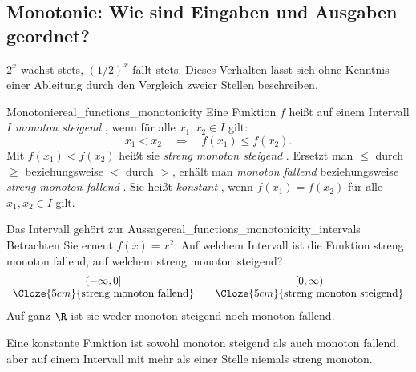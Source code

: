 \subsection{Monotonie: Wie sind Eingaben und Ausgaben geordnet?}
\label{subsec:real_functions_monotonicity}
$2^x$ wächst stets, $(1/2)^x$ fällt stets. Dieses Verhalten lässt
sich ohne Kenntnis einer Ableitung durch den Vergleich zweier Stellen
beschreiben.
\par\noindent\begin{minipage}{\linewidth}
\begin{FunctionPropertyBox}{Monotonie}{real_functions_monotonicity}
  Eine Funktion $f$ heißt auf einem Intervall $I$
  \emph{monoton steigend} ,
  wenn für alle $x_1,x_2\in I$ gilt:
  \[
    x_1<x_2\quad\Longrightarrow\quad f(x_1)\le f(x_2).
  \]
  Mit $f(x_1)<f(x_2)$ heißt sie \emph{streng monoton steigend}
  .
  Ersetzt man $\le$ durch $\ge$ beziehungsweise $<$ durch $>$,
  erhält man \emph{monoton fallend} 
  beziehungsweise \emph{streng monoton fallend} .
  Sie heißt \emph{konstant} , wenn
  $f(x_1)=f(x_2)$ für alle $x_1,x_2\in I$ gilt.
\end{FunctionPropertyBox}
\begin{ExampleBox}[before skip=0.3\baselineskip]{Das Intervall gehört zur Aussage}{real_functions_monotonicity_intervals}
  Betrachten Sie erneut $f(x)=x^2$. Auf welchem Intervall ist die
  Funktion streng monoton fallend, auf welchem streng monoton steigend?
  \[
    \begin{array}{c@{\qquad}c}
      (-\infty,0]&[0,\infty)\\
      \Cloze{5cm}{\text{streng monoton fallend}}&
      \Cloze{5cm}{\text{streng monoton steigend}}
    \end{array}
  \]
  Auf ganz $\R$ ist sie weder monoton steigend noch monoton fallend.
\end{ExampleBox}
\end{minipage}

\begin{center}
\end{center}
Eine konstante Funktion ist sowohl monoton steigend als auch monoton
fallend, aber auf einem Intervall mit mehr als einer Stelle niemals streng monoton.

